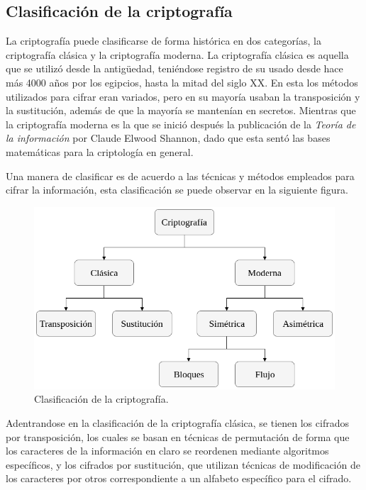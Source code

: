   \subsection{Clasificación de la criptografía}

    La criptografía puede clasificarse de forma histórica en dos categorías,
    la criptografía clásica y la criptografía moderna. La criptografía clásica
    es aquella que se utilizó desde la antigüedad, teniéndose registro de su
    usado desde hace más 4000 años por los egipcios, hasta la mitad del siglo
    XX. En esta los métodos utilizados para cifrar eran variados, pero en su
    mayoría usaban la transposición y la sustitución, además de que la mayoría
    se mantenían en secretos. Mientras que la criptografía moderna es la que
    se inició después la publicación de la \textit{Teoría de la información}
    por Claude Elwood Shannon, dado que esta sentó las bases matemáticas para
    la criptología en general.

    Una manera de clasificar es de acuerdo a las técnicas y métodos empleados
    para cifrar la información, esta clasificación se puede observar en la
    siguiente figura.

    \begin{figure}[H]
      \begin{center}
        \includegraphics[width=0.7\linewidth]
          {contenidos/antecedentes/intro_img/clasificacion_cripto.png}
        \caption{Clasificación de la criptografía.}
      \end{center}
    \end{figure}

    Adentrandose en la clasificación de la criptografía clásica, se tienen los 
    cifrados por transposición, los cuales se basan en técnicas de permutación 
    de forma que los caracteres de la información en claro se reordenen 
    mediante algoritmos específicos, y los cifrados por sustitución, que 
    utilizan técnicas de modificación de los caracteres por otros
    correspondiente a un alfabeto específico para el cifrado.

